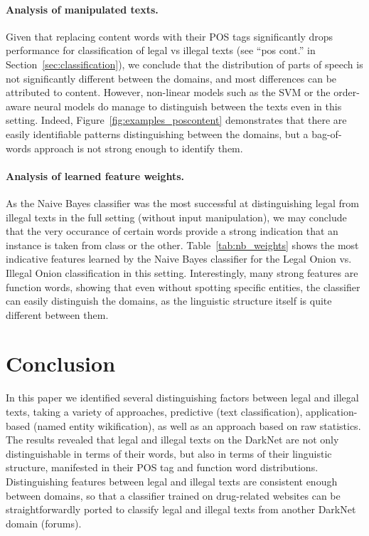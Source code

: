 \documentclass[11pt,a4paper,table]{article}
\begin{document}
  \paragraph{Analysis of manipulated texts.}

    Given that replacing content words with their POS tags significantly drops
    performance for classification of legal vs illegal texts
    (see ``pos cont.'' in Section~\ref{sec:classification}),
    we conclude that the distribution of parts of speech is not significantly
    different between the domains,
    and most differences can be attributed to content.
    However, non-linear models such as the SVM or the order-aware neural models
    do manage to distinguish between the texts even in this setting.
    Indeed, Figure~\ref{fig:examples_poscontent} demonstrates that
    there are easily identifiable patterns distinguishing between the domains,
    but a bag-of-words approach is not strong enough to identify them. 

  \paragraph{Analysis of learned feature weights.}

    As the Naive Bayes classifier was the most successful at distinguishing
    legal from illegal texts in the full setting (without input manipulation),
    we may conclude that the very occurance of certain words provide a strong indication
    that an instance is taken from class or the other.
    Table~\ref{tab:nb_weights} shows the most indicative features learned
    by the Naive Bayes classifier for the
    Legal Onion vs. Illegal Onion classification in this setting.
    Interestingly, many strong features are function words,
    showing that even without spotting specific entities,
    the classifier can easily distinguish the domains, as the linguistic structure itself
    is quite different between them.

\section{Conclusion} \label{sec:conclusion}

  In this paper we identified several distinguishing factors between legal and illegal texts, taking
  a variety of approaches, predictive (text classification), application-based (named entity wikification),
  as well as an approach based on raw statistics. The results revealed that legal and illegal texts on the DarkNet
  are not only distinguishable in terms of their words, but also in terms of their linguistic structure, manifested
  in their POS tag and function word distributions. Distinguishing features between legal and illegal texts are
  consistent enough between domains, so that a classifier trained on drug-related websites can be straightforwardly
  ported to classify legal and illegal texts from another DarkNet domain (forums).
\end{document}
